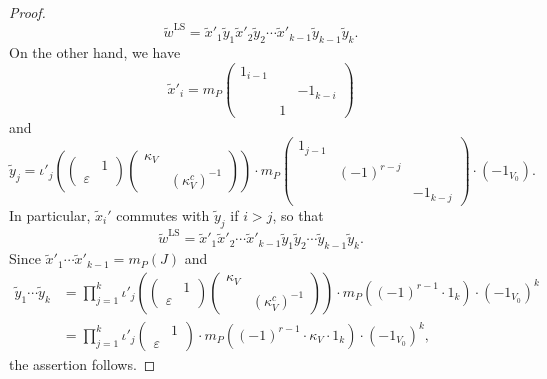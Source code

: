 \documentclass[11pt]{amsart}
\numberwithin{equation}{section}
\theoremstyle{plain}
\theoremstyle{definition}
\theoremstyle{remark}
\def\LS{\mathrm{LS}}
\begin{document}
\begin{proof}
\[
 \tilde{w}^\LS = \tilde{x}'_1 \tilde{y}_1 \tilde{x}'_2 \tilde{y}_2 \cdots \tilde{x}'_{k-1} \tilde{y}_{k-1} \tilde{y}_k.
\]
On the other hand, we have
\[
 \tilde{x}'_i = m_P
 \begin{pmatrix}
  1_{i-1} & & \\
  & & -1_{k-i} \\
  & 1 & 
 \end{pmatrix}
\]
and
\[
 \tilde{y}_j =
 \iota'_j \left(
 \begin{pmatrix}
 & 1 \\
 \varepsilon &
 \end{pmatrix}
 \begin{pmatrix}
 \kappa_V & \\
 & (\kappa_V^c)^{-1}
 \end{pmatrix}
 \right)
 \cdot m_P \begin{pmatrix} 1_{j-1} & & \\ & (-1)^{r-j} & \\ & & - 1_{k-j}
 \end{pmatrix}
 \cdot (-1_{V_0}).
\]
In particular, $\tilde{x}_i'$ commutes with $\tilde{y}_j$ if $i > j$, so that
\[
 \tilde{w}^\LS = \tilde{x}'_1 \tilde{x}'_2 \cdots \tilde{x}'_{k-1} \tilde{y}_1 \tilde{y}_2 \cdots \tilde{y}_{k-1} \tilde{y}_k.
\]
Since $\tilde{x}'_1 \cdots \tilde{x}'_{k-1} = m_P(J)$ and 
\begin{align*}
 \tilde{y}_1 \cdots \tilde{y}_k
 & = \prod_{j=1}^k
 \iota'_j \left(
 \begin{pmatrix}
 & 1 \\
 \varepsilon &
 \end{pmatrix}
 \begin{pmatrix}
 \kappa_V & \\
 & (\kappa_V^c)^{-1}
 \end{pmatrix}
 \right)
 \cdot m_P((-1)^{r-1} \cdot 1_k) \cdot (-1_{V_0})^k \\
 & = \prod_{j=1}^k
 \iota'_j 
 \begin{pmatrix}
 & 1 \\
 \varepsilon &
 \end{pmatrix}
 \cdot m_P((-1)^{r-1} \cdot \kappa_V \cdot 1_k) \cdot (-1_{V_0})^k,
\end{align*}
the assertion follows.
\end{proof}
\end{document}
